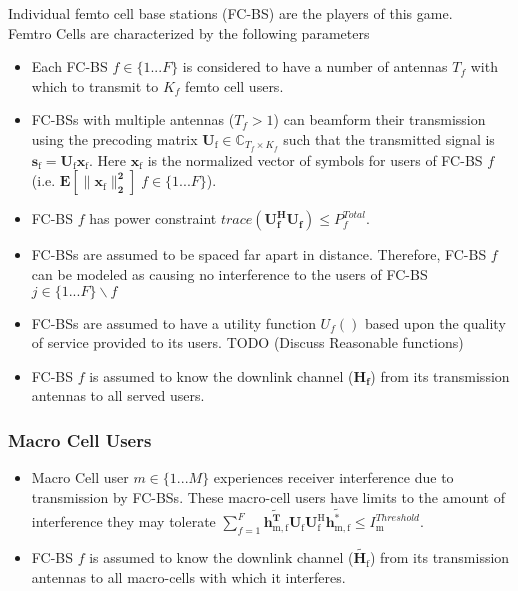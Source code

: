 \documentclass[12pt]{article}
\begin{document}
Individual femto cell base stations (FC-BS) are the players of this game.
\\
Femtro Cells are characterized by the following parameters
\begin{itemize}
\item Each FC-BS  $f \in \{1 ... F\}$ is considered to have a number of antennas $T_f$ with which to transmit to $K_f$ femto cell users.
\\
\item FC-BSs with multiple antennas ($T_f >1$) can beamform their transmission using the precoding matrix $\mathbf{U_{\mathrm{f}}} \in \mathbb{C}_{T_f \times K_f}$ such that the transmitted signal is $\mathbf{s_{\mathrm{f}
}}= \mathbf{U_{\mathrm{f}}}\mathbf{x_{\mathrm{f}}}$. Here $\mathbf{x_{\mathrm{f}}}$ is the normalized vector of symbols for users of FC-BS $f$ (i.e. $\mathbf{E[\|\mathbf{x_{\mathrm{f}}}\|_2^2]} \; f \in \{1 ... F\}$).
\\
\item 
FC-BS $f$ has power constraint $trace(\mathbf{U_f^H}\mathbf{U_f}) \leq P^{Total}_{f} $.
\\
\item FC-BSs are assumed to be spaced far apart in distance. Therefore, FC-BS $f$ can be modeled as causing no interference to the users of FC-BS $j \in \{1 ... F\}\backslash f$
\item 
 FC-BSs are assumed to have a utility function $U_f()$ based upon the quality of service provided to its users. TODO (Discuss Reasonable functions)
\\
\item FC-BS $f$ is assumed to know the downlink channel ($\mathbf{H_f}$) from its transmission antennas to all served users.
\\
\end{itemize}





\subsubsection{Macro Cell Users}

\begin{itemize}
\item 
Macro Cell user $m \in \{1 ... M\}$ experiences receiver interference due to transmission by FC-BSs. These macro-cell users have limits to the amount of interference they may tolerate 
$\sum^F_{f=1} \mathbf{\tilde{h_{\mathrm{m,f}}^T}}  \mathbf{U_{\mathrm{f}}}  \mathbf{U_{\mathrm{f}}^{\mathrm{H}}} \mathbf{\tilde{h_{\mathrm{m,f}}^*}} \leq I^{Threshold}_{\mathrm{m}} $.

\item FC-BS $f$ is assumed to know the downlink channel ($\tilde{\mathbf{H}_{\mathrm{f}}}$) from its transmission antennas to all macro-cells with which it interferes.
\\
\end{itemize}
\end{document}
